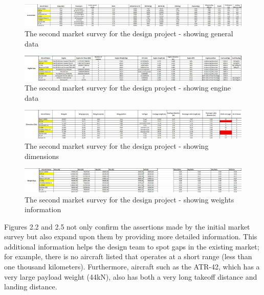 \documentclass[stu, a4paper, 12pt, floatsintext]{apa7}
\numberwithin{figure}{section}
\numberwithin{table}{section}
\numberwithin{equation}{section}
\begin{document}
\begin{figure}[H]
    \caption{The second market survey for the design project - showing general data}
    \label{fig:market_survey_detailed_1}
    \centering
    \includegraphics[width=1.1\textwidth]{pictures/market_survey_detailed_1.jpg}
\end{figure}
\begin{figure}[H]
    \caption{The second market survey for the design project - showing engine data}
    \label{fig:market_survey_detailed_2}
    \centering
    \includegraphics[width=1.1\textwidth]{pictures/market_survey_detailed_2.jpg}
\end{figure}
\begin{figure}[H]
    \caption{The second market survey for the design project - showing dimensions}
    \label{fig:market_survey_detailed_3}
    \centering
    \includegraphics[width=1.1\textwidth]{pictures/market_survey_detailed_3.jpg}
\end{figure}
\begin{figure}[H]
    \caption{The second market survey for the design project - showing weights information}
    \label{fig:market_survey_detailed_4}
    \centering
    \includegraphics[width=1.1\textwidth]{pictures/market_survey_detailed_4.jpg}
\end{figure}

Figures 2.2 and 2.5 not only confirm the assertions made by the initial market survey but also expand upon them by providing more detailed information. This additional information helps the design team to spot gaps in the existing market; for example, there is no aircraft listed that operates at a short range (less than one thousand kilometers). Furthermore, aircraft such as the ATR-42, which has a very large payload weight (44kN), also has both a very long takeoff distance and landing distance.
\end{document}
